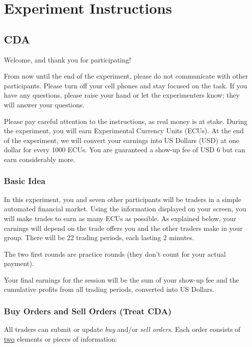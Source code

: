 \newpage
\section{Experiment Instructions}
\subsection{CDA} \label{app_instruction_cda}

Welcome, and thank you for participating!

From now until the end of the experiment, please do not communicate with
other participants. Please turn off your cell phones and stay focused on
the task. If you have any questions, please raise your hand or let the
experimenters know; they will answer your questions.

Please pay careful attention to the instructions, as real money is at
stake. During the experiment, you will earn Experimental Currency Units
(ECUs). At the end of the experiment, we will convert your earnings into
US Dollars (USD) at one dollar for every 1000 ECUs. You are guaranteed a
show-up fee of USD 6 but can earn considerably more.

\subsubsection*{Basic Idea}\label{basic-idea_cda}

In this experiment, you and seven other participants will be traders in
a simple automated financial market. Using the information displayed on
your screen, you will make trades to earn as many ECUs as possible. As
explained below, your earnings will depend on the trade offers you and
the other traders make in your group. There will be 22 trading periods,
each lasting 2 minutes.

The two first rounds are practice rounds (they don't count for your actual payment).

Your final earnings for the session will be the sum of your show-up fee
and the cumulative profits from all trading periods, converted into US
Dollars.

\subsubsection*{Buy Orders and Sell Orders (Treat
CDA)}\label{buy-orders-and-sell-orders-treat-cda}

All traders can submit or update \emph{buy} and/or \emph{sell orders}.
Each order consists of \ul{two} elements or pieces of information:

